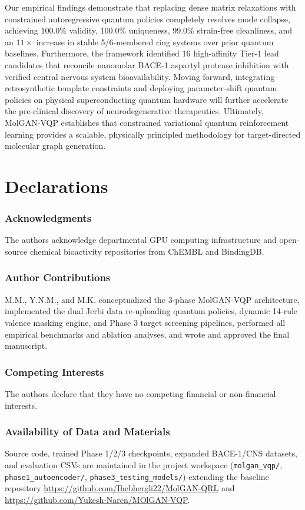 \documentclass[10pt,a4paper]{article}
\begin{document}
Our empirical findings demonstrate that replacing dense matrix relaxations with constrained autoregressive quantum policies completely resolves mode collapse, achieving 100.0\% validity, 100.0\% uniqueness, 99.0\% strain-free cleanliness, and an $11\times$ increase in stable 5/6-membered ring systems over prior quantum baselines. Furthermore, the framework identified 16 high-affinity Tier-1 lead candidates that reconcile nanomolar BACE-1 aspartyl protease inhibition with verified central nervous system bioavailability. Moving forward, integrating retrosynthetic template constraints and deploying parameter-shift quantum policies on physical superconducting quantum hardware will further accelerate the pre-clinical discovery of neurodegenerative therapeutics. Ultimately, MolGAN-VQP establishes that constrained variational quantum reinforcement learning provides a scalable, physically principled methodology for target-directed molecular graph generation.

\section*{Declarations}
\subsubsection*{Acknowledgments}
The authors acknowledge departmental GPU computing infrastructure and open-source chemical bioactivity repositories from ChEMBL and BindingDB.

\subsubsection*{Author Contributions}
M.M., Y.N.M., and M.K. conceptualized the 3-phase MolGAN-VQP architecture, implemented the dual Jerbi data re-uploading quantum policies, dynamic 14-rule valence masking engine, and Phase 3 target screening pipelines, performed all empirical benchmarks and ablation analyses, and wrote and approved the final manuscript.

\subsubsection*{Competing Interests}
The authors declare that they have no competing financial or non-financial interests.

\subsubsection*{Availability of Data and Materials}
Source code, trained Phase 1/2/3 checkpoints, expanded BACE-1/CNS datasets, and evaluation CSVs are maintained in the project workspace (\texttt{molgan\_vqp/}, \texttt{phase1\_autoencoder/}, \texttt{phase3\_testing\_models/}) extending the baseline repository \url{https://github.com/Ihebhergli22/MolGAN-QRL} and \url{https://github.com/Yukesh-Naren/MOlGAN-VQP}.
\end{document}
